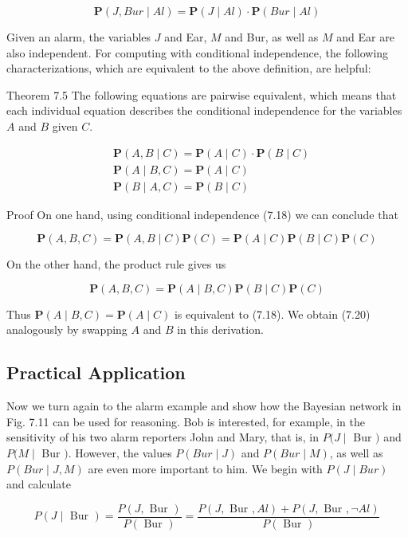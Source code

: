 \documentclass[10pt]{book}
\begin{document}
$$
\boldsymbol{P}(J, B u r \mid A l)=\boldsymbol{P}(J \mid A l) \cdot \boldsymbol{P}(B u r \mid A l)
$$

Given an alarm, the variables $J$ and Ear, $M$ and Bur, as well as $M$ and Ear are also independent. For computing with conditional independence, the following characterizations, which are equivalent to the above definition, are helpful:

Theorem 7.5 The following equations are pairwise equivalent, which means that each individual equation describes the conditional independence for the variables $A$ and $B$ given $C$.


\begin{align*}
& \boldsymbol{P}(A, B \mid C)=\boldsymbol{P}(A \mid C) \cdot \boldsymbol{P}(B \mid C)  \tag{7.18}\\
& \boldsymbol{P}(A \mid B, C)=\boldsymbol{P}(A \mid C)  \tag{7.19}\\
& \boldsymbol{P}(B \mid A, C)=\boldsymbol{P}(B \mid C) \tag{7.20}
\end{align*}


Proof On one hand, using conditional independence (7.18) we can conclude that

$$
\boldsymbol{P}(A, B, C)=\boldsymbol{P}(A, B \mid C) \boldsymbol{P}(C)=\boldsymbol{P}(A \mid C) \boldsymbol{P}(B \mid C) \boldsymbol{P}(C)
$$

On the other hand, the product rule gives us

$$
\boldsymbol{P}(A, B, C)=\boldsymbol{P}(A \mid B, C) \boldsymbol{P}(B \mid C) \boldsymbol{P}(C)
$$

Thus $\boldsymbol{P}(A \mid B, C)=\boldsymbol{P}(A \mid C)$ is equivalent to (7.18). We obtain (7.20) analogously by swapping $A$ and $B$ in this derivation.

\subsection{Practical Application}
Now we turn again to the alarm example and show how the Bayesian network in Fig. 7.11 can be used for reasoning. Bob is interested, for example, in the sensitivity of his two alarm reporters John and Mary, that is, in $P(J \mid$ Bur $)$ and $P(M \mid$ Bur $)$. However, the values $P(B u r \mid J)$ and $P(B u r \mid M)$, as well as $P(B u r \mid J, M)$ are even more important to him. We begin with $P(J \mid B u r)$ and calculate


\begin{equation*}
P(J \mid \text { Bur })=\frac{P(J, \text { Bur })}{P(\text { Bur })}=\frac{P(J, \text { Bur }, A l)+P(J, \text { Bur }, \neg A l)}{P(\text { Bur })} \tag{7.21}
\end{equation*}
\end{document}
